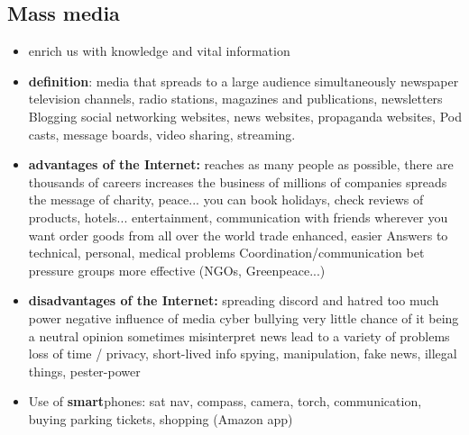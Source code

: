 \documentclass[a5paper,12pt,twoside,titlepage]{scrartcl}
\begin{document}
\subsection{Mass media}
\begin{itemize}
	\item enrich us with knowledge and vital information
	\item \textbf{definition}: media that spreads to a large audience simultaneously
	\subitem newspaper television channels, radio stations, magazines and publications, newsletters
	\subitem Blogging social networking websites, news websites, propaganda websites, Pod casts, message boards, video sharing, streaming.
	\item \textbf{advantages of the Internet: }
	\subitem reaches as many people as possible, 
	\subitem there are thousands of careers
	\subitem increases the business of millions of companies
	\subitem spreads the message of charity, peace...
	\subitem you can book holidays, check reviews of products, hotels...
	\subitem entertainment, communication with friends wherever you want
	\subitem order goods from all over the world
	\subitem trade enhanced, easier
	\subitem Answers to technical, personal, medical problems
	\subitem Coordination/communication bet pressure groups \textrightarrow more effective (NGOs, Greenpeace...)
	\item \textbf{disadvantages of the Internet:}
	\subitem spreading discord and hatred
	\subitem too much power
	\subitem negative influence of media
	\subitem cyber bullying
	\subitem very little chance of it being a neutral opinion
	\subitem sometimes misinterpret news \textrightarrow lead to a variety of problems
	\subitem loss of time / privacy, short-lived info
	\subitem spying, manipulation, fake news,  illegal things, pester-power
	\item Use of \textbf{smart}phones:
	\subitem sat nav, compass, 
	\subitem camera, torch, 
	\subitem communication, 
	\subitem buying parking tickets, shopping (Amazon app)
	
\end{itemize}
\end{document}
